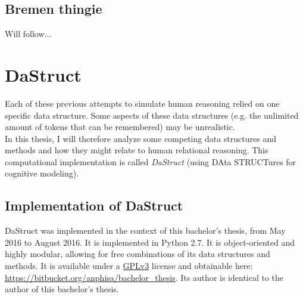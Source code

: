 \documentclass[hidelinks]{scrartcl}
\begin{document}
\subsection{Bremen thingie}
Will follow...

\section{DaStruct}
Each of these previous attempts to simulate human reasoning relied on one specific data structure. Some aspects of these data structures (e.g. the unlimited amount of \gls{token}s that can be remembered) may be unrealistic. \\
In this thesis, I will therefore analyze some competing data structures and methods and how they might relate to human relational reasoning. This computational implementation is called \textit{DaStruct} (using DAta STRUCTures for cognitive modeling).

\subsection{Implementation of DaStruct}
DaStruct was implemented in the context of this bachelor's thesis, from May 2016 to August 2016. It is implemented in Python 2.7. It is object-oriented and highly modular, allowing for free combinations of its data structures and methods. It is available under a \href{https://www.gnu.org/copyleft/gpl.html}{GPLv3} license and obtainable here: \url{https://bitbucket.org/anphisa/bachelor_thesis}. Its author is identical to the author of this bachelor's thesis.\\
\end{document}
